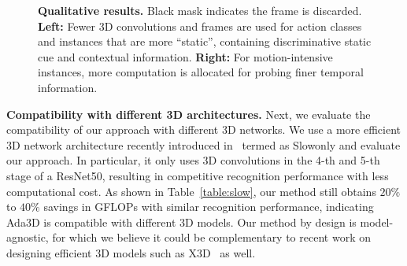 \documentclass[final]{cvpr}
\newcommand{\system}{{Ada3D}\xspace}
\begin{document}
\begin{figure*}[!t] \centering
    \vspace{-0.35in}
    \caption{\textbf{Qualitative results.} Black mask indicates the frame is discarded. \textbf{Left:} Fewer 3D convolutions and frames are used for action classes and instances that are more ``static'', \ie containing discriminative static cue and contextual information. \textbf{Right:} For motion-intensive instances, more computation is allocated for probing finer temporal information.}
   \label{fig:quals}
   \end{figure*}
\vspace{0.05in}
\noindent\textbf{Compatibility with different 3D architectures.} Next, we evaluate the compatibility of our approach with different 3D networks. We use a more efficient 3D network architecture recently introduced in~\cite{slowfast} termed as Slowonly and evaluate our approach. In particular, it only uses 3D convolutions in the 4-th and 5-th stage of a ResNet50, resulting in competitive recognition performance with less computational cost. As shown in Table~\ref{table:slow}, our method still obtains $20\%$ to $40\%$ savings in GFLOPs with similar recognition performance, indicating \system is compatible with different 3D models. Our method by design is model-agnostic, for which we believe it could be complementary to recent work on designing efficient 3D models such as X3D~\cite{x3d} as well. 

\begin{table}[h]  \centering
    \vspace{-0.1in}
    \caption{Results on FCVID~\cite{fcvid} using Slowonly~\cite{slowfast} architecture as 3D model. \textbf{Top}: 8-frame input setting. \textbf{Bottom}: 16-frame input setting.}
    \label{table:slow}
    \end{table}
    
\end{document}
